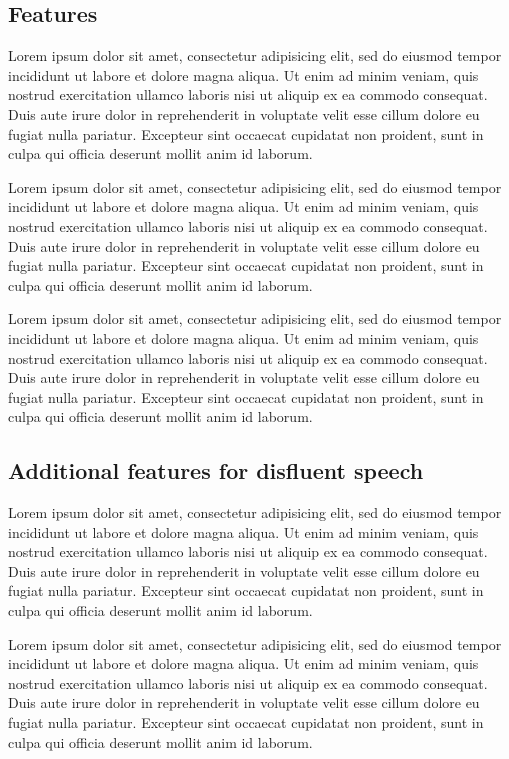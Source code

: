 \documentclass[11pt,letterpaper]{article}
\begin{document}
\subsection{Features}

Lorem ipsum dolor sit amet, consectetur adipisicing elit, sed do eiusmod tempor incididunt ut labore et dolore magna aliqua. Ut enim ad minim veniam, quis nostrud exercitation ullamco laboris nisi ut aliquip ex ea commodo consequat. Duis aute irure dolor in reprehenderit in voluptate velit esse cillum dolore eu fugiat nulla pariatur. Excepteur sint occaecat cupidatat non proident, sunt in culpa qui officia deserunt mollit anim id laborum.

Lorem ipsum dolor sit amet, consectetur adipisicing elit, sed do eiusmod tempor incididunt ut labore et dolore magna aliqua. Ut enim ad minim veniam, quis nostrud exercitation ullamco laboris nisi ut aliquip ex ea commodo consequat. Duis aute irure dolor in reprehenderit in voluptate velit esse cillum dolore eu fugiat nulla pariatur. Excepteur sint occaecat cupidatat non proident, sunt in culpa qui officia deserunt mollit anim id laborum.

Lorem ipsum dolor sit amet, consectetur adipisicing elit, sed do eiusmod tempor incididunt ut labore et dolore magna aliqua. Ut enim ad minim veniam, quis nostrud exercitation ullamco laboris nisi ut aliquip ex ea commodo consequat. Duis aute irure dolor in reprehenderit in voluptate velit esse cillum dolore eu fugiat nulla pariatur. Excepteur sint occaecat cupidatat non proident, sunt in culpa qui officia deserunt mollit anim id laborum.

\subsection{Additional features for disfluent speech}

Lorem ipsum dolor sit amet, consectetur adipisicing elit, sed do eiusmod tempor incididunt ut labore et dolore magna aliqua. Ut enim ad minim veniam, quis nostrud exercitation ullamco laboris nisi ut aliquip ex ea commodo consequat. Duis aute irure dolor in reprehenderit in voluptate velit esse cillum dolore eu fugiat nulla pariatur. Excepteur sint occaecat cupidatat non proident, sunt in culpa qui officia deserunt mollit anim id laborum.

Lorem ipsum dolor sit amet, consectetur adipisicing elit, sed do eiusmod tempor incididunt ut labore et dolore magna aliqua. Ut enim ad minim veniam, quis nostrud exercitation ullamco laboris nisi ut aliquip ex ea commodo consequat. Duis aute irure dolor in reprehenderit in voluptate velit esse cillum dolore eu fugiat nulla pariatur. Excepteur sint occaecat cupidatat non proident, sunt in culpa qui officia deserunt mollit anim id laborum.
\end{document}
